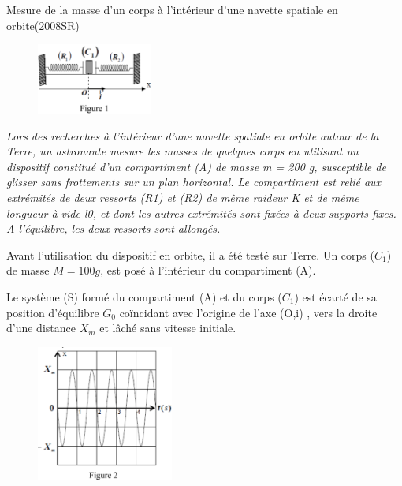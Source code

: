 \documentclass[12pt]{article}
\begin{document}
\begin{Box2}{Mesure de la masse d’un corps à l’intérieur d’une navette spatiale en
  orbite(2008SR) }

	\begin{figure}
		\begin{center}
			\vspace{-0.6cm}
			\includegraphics[width=0.34\textwidth]{./img/double_pendule00.png}
      
		\end{center}
	\end{figure}


  \emph{Lors des recherches à l’intérieur d’une navette spatiale en orbite autour de la Terre,
un astronaute mesure les masses de quelques corps en utilisant un dispositif
constitué d’un compartiment (A) de masse m = 200 g, susceptible de glisser sans
frottements sur un plan horizontal. Le compartiment est relié aux extrémités de
deux ressorts (R1) et (R2) de même raideur K et de même longueur à vide l0, et dont
les autres extrémités sont fixées à deux supports fixes.
A l’équilibre, les deux ressorts sont allongés.}
 
	Avant l’utilisation du dispositif en orbite, il a été testé sur Terre.
Un corps ($C_1$) de masse $M = 100 g$, est posé à
l’intérieur du compartiment (A).

Le système (S) formé du compartiment (A) et
du corps ($C_1$) est écarté de sa position
d’équilibre $G_0$ coïncidant avec l’origine de l’axe
(O,i)
, vers la droite d’une distance $X_m$ et lâché
sans vitesse initiale.
\begin{figure}
		\begin{center}
			\includegraphics[width=0.4\textwidth]{./img/double_Pendule.png}
		\end{center}
	\end{figure}




\end{Box2}
\end{document}
